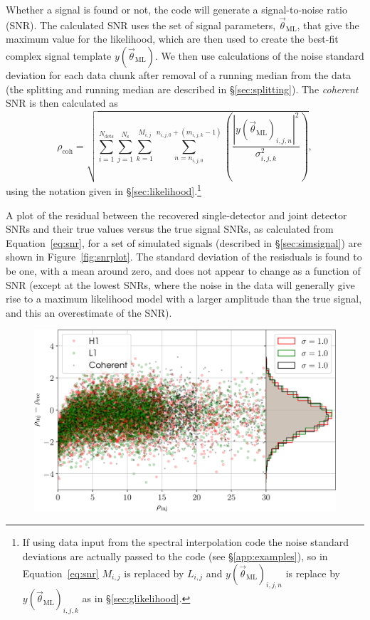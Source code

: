 Whether a signal is found or not, the code will generate a signal-to-noise ratio (SNR). The calculated SNR uses the set of signal
parameters, $\vec{\theta}_{\text{ML}}$, that give the maximum value for the likelihood, which are then used to create the best-fit
complex signal template $y(\vec{\theta}_{\text{ML}})$. We then use calculations of the
noise standard deviation for each data chunk after removal of a running median from the data (the splitting and running median are
described in \S\ref{sec:splitting}). The {\it coherent} SNR is then calculated as
\begin{equation}\label{eq:snr}
 \rho_{\text{coh}} = \sqrt{\sum_{i=1}^{N_{\text{dets}}} \sum_{j=1}^{N_{\text{s}}}
\sum_{k=1}^{M_{i,j}} \sum_{n=n_{i,j,0}}^{n_{i,j,0}+(m_{i,j,k}-1)}\left(\frac{|y(\vec{\theta}_{\text{ML}})_{i,j,n}|^2}{\sigma_{i,j,k}^2}\right)},
\end{equation}
using the notation given in \S\ref{sec:likelihood}.\footnote{If using data input from the spectral interpolation code \citep{2017CQGra..34a5010D}
the noise standard deviations are actually passed to the code (see \S\ref{app:examples}), so in Equation~\ref{eq:snr} $M_{i,j}$ is replaced
by $L_{i,j}$ and $y(\vec{\theta}_{\text{ML}})_{i,j,n}$ is replace by $y(\vec{\theta}_{\text{ML}})_{i,j,k}$ as in \S\ref{sec:glikelihood}.}

A plot of the residual between the recovered single-detector and joint detector SNRs and their true values versus the true signal SNRs,
as calculated from Equation~\ref{eq:snr}, for a set of simulated signals (described in \S\ref{sec:simsignal}) are shown in Figure~\ref{fig:snrplot}.
The standard deviation of the resisduals is found to be one, with a mean around zero, and does not appear to change as a function of SNR (except at the
lowest SNRs, where the noise in the data will generally give rise to a maximum likelihood model with a larger amplitude than the true signal, and this
an overestimate of the SNR).

\begin{figure}[!phtb]
\begin{center}
\includegraphics[width=1\columnwidth]{./figures/codeeval/stats/snrs/snr_plot}
\caption{ \protect}
\end{center}
\end{figure}

